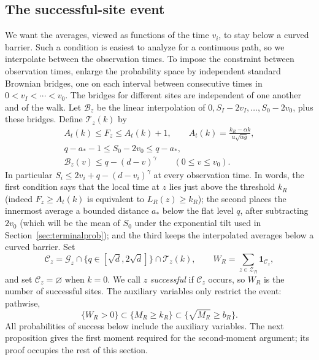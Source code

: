 \documentclass[11pt,letterpaper,reqno]{amsart}
\newif\ifrevmarks \revmarkstrue
\newcommand{\add}[1]{\ifrevmarks\textcolor{revorange}{#1}\else#1\fi}
\numberwithin{equation}{section}
\theoremstyle{remark}
\begin{document}
\subsection{\texorpdfstring{\add{The successful-site event}}{The successful-site event}}\label{sec:success}
\add{We want the averages, viewed as functions of the time $v_i$, to stay below a curved barrier. Such a condition is easiest to analyze for a continuous path, so we interpolate between the observation times.} To impose the constraint between observation times, enlarge the probability space by independent standard Brownian bridges, one on each interval between consecutive times in $0<v_I<\cdots<v_0$. The bridges for different sites are independent of one another and of the walk. Let $\mathcal B_z$ be the linear interpolation of
$0,S_I-2v_I,\ldots,S_0-2v_0$, plus these bridges. Define $\mathcal T_z(k)$ by
\begin{equation}\label{eq:5.10}
\begin{gathered}
A_t(k)\le F_z\le A_t(k)+1,\qquad
A_t(k)=\frac{k_R-\alpha k}{u\sqrt{\alpha g}},\\
q-a_*-1\le S_0-2v_0\le q-a_*,\\
\mathcal B_z(v)\le q-(d-v)^\gamma\qquad(0\le v\le v_0).
\end{gathered}
\end{equation}
In particular $S_i\le2v_i+q-(d-v_i)^\gamma$ at every observation time. \add{In words, the first condition says that the local time at $z$ lies just above the threshold $k_R$ (indeed $F_z\ge A_t(k)$ is equivalent to $L_R(z)\ge k_R$); the second places the innermost average a bounded distance $a_*$ below the flat level $q$, after subtracting $2v_0$ (which will be the mean of $S_0$ under the exponential tilt used in Section~\ref{sec:terminalprob}); and the third keeps the interpolated averages below a curved barrier.}
Set
\begin{equation}\label{eq:5.15}
\mathcal C_z=\mathcal G_z\cap\{q\in[\sqrt d,2\sqrt d]\}\cap\mathcal T_z(k),
\qquad W_R=\sum_{z\in\mathscr Z_R}\mathbf1_{\mathcal C_z},
\end{equation}
and set $\mathcal C_z=\varnothing$ when $k=0$. \add{We call $z$ \emph{successful} if $\mathcal C_z$ occurs, so $W_R$ is the number of successful sites.} The auxiliary variables only restrict the event: pathwise,
\begin{equation}\label{eq:5.16}
\{W_R>0\}\subset\{M_R\ge k_R\}\subset\{\sqrt{M_R}\ge b_R\}.
\end{equation}
All probabilities of success below include the auxiliary variables. The next proposition gives the first moment required for the second-moment argument; its proof occupies the rest of this section.
\end{document}
